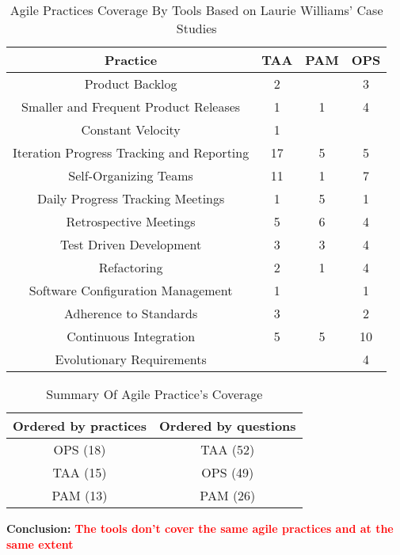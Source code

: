 \begin{table} [H]
	\footnotesize
	\begin{tabular}{| c | c | c | c |} \hline
		\textbf{Practice} & \textbf{TAA} & \textbf{PAM} & \textbf{OPS} \\ \hline
		Product Backlog & 2 & & 3 \\ \hline
		Smaller and Frequent Product Releases & 1 & 1 & 4 \\ \hline
		Constant Velocity & 1 & & \\ \hline
		Iteration Progress Tracking and Reporting & 17 & 5 & 5 \\ \hline
		Self-Organizing Teams & 11 & 1 & 7 \\ \hline
		Daily Progress Tracking Meetings & 1 & 5 & 1 \\ \hline
		Retrospective Meetings & 5 & 6 & 4 \\ \hline
		Test Driven Development & 3 & 3 & 4 \\ \hline
		Refactoring & 2 & 1 & 4 \\ \hline
		Software Configuration Management & 1 & & 1 \\ \hline
		Adherence to Standards & 3 & & 2 \\ \hline
		Continuous Integration & 5 & 5 & 10 \\ \hline	
		Evolutionary Requirements & & & 4 \\ \hline
	\end{tabular}
	\caption{{\footnotesize Agile Practices Coverage By Tools Based on Laurie Williams' Case Studies}}
\end{table}

\clearpage

\begin{table}
	\begin{tabular}{| c | c |} \hline
		\textbf{Ordered by practices} & \textbf{Ordered by questions} \\ \hline
		OPS (18) & TAA (52) \\ \hline
		TAA (15) & OPS (49) \\ \hline
		PAM (13) & PAM (26) \\ \hline
	\end{tabular}
	\caption{Summary Of Agile Practice's Coverage}
	\label{table:agile_practices_coverage_summary}
\end{table}

\textbf{Conclusion:} \textcolor{red}{\textbf{The tools don't cover the same agile practices and  at the same extent}} \\

\clearpage